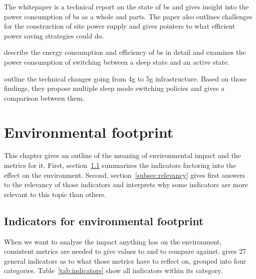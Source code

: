 \documentclass[11pt,a4paper]{article}
\begin{document}
The whitepaper \citep{powerwhitepaper} is a technical report on the state of \acrfull{bs} and gives insight into the power consumption of \acrshort{bs} as a whole and parts.
The paper also outlines challenges for the construction of site power supply and gives pointers to what efficient power saving strategies could do.

\citep{5GEfficiencyOverview} describe the energy consumption and efficiency of \acrshort{bs} in detail and examines the power consumption of switching between a sleep state and an active state.

\citep{DynamicSleepModeControl} outline the technical changes going from \acrshort{4g} to \acrfull{5g} infrastructure.
Based on those findings, they propose multiple sleep mode switching policies and gives a comparison between them.

\section{Environmental footprint}\label{sec:energyfootprint}
This chapter gives an outline of the meaning of environmental impact and the metrics for it.
First, section~\ref{subsec:indicators} summarizes the indicators factoring into the effect on the environment.
Second, section~\ref{subsec:relevancy} gives first answers to the relevancy of those indicators and interprets why some indicators are more relevant to this topic than others.

\subsection{Indicators for environmental footprint}\label{subsec:indicators}

When we want to analyze the impact anything has on the environment, consistent metrics are needed to give values to and to compare against.
\citep{Umweltindikatoren} gives 27 general indicators as to what those metrics have to reflect on, grouped into four categories.
Table~\ref{tab:indicators} show all indicators within its category.
\end{document}

